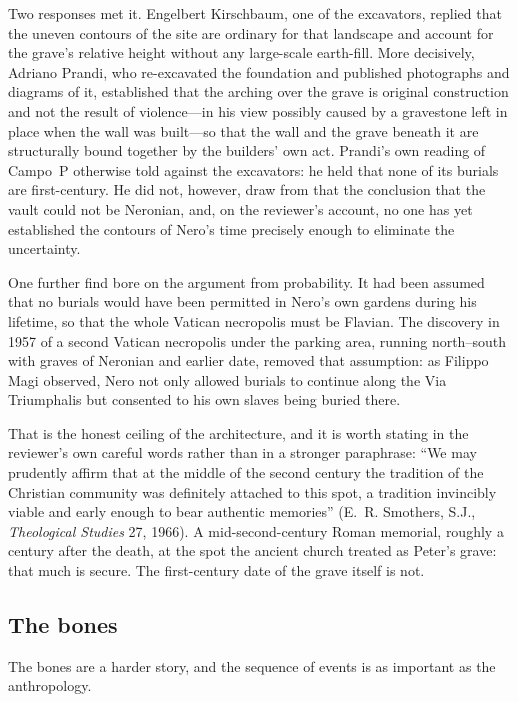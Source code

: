 Two responses met it. Engelbert Kirschbaum, one of the excavators, replied
that the uneven contours of the site are ordinary for that landscape and
account for the grave's relative height without any large-scale earth-fill.
More decisively, Adriano Prandi, who re-excavated the foundation and
published photographs and diagrams of it, established that the arching over
the grave is original construction and not the result of violence---in his
view possibly caused by a gravestone left in place when the wall was
built---so that the wall and the grave beneath it are structurally bound
together by the builders' own act. Prandi's own reading of Campo~P otherwise
told against the excavators: he held that none of its burials are
first-century. He did not, however, draw from that the conclusion that the
vault could not be Neronian, and, on the reviewer's account, no one has yet
established the contours of Nero's time precisely enough to eliminate the
uncertainty.

One further find bore on the argument from probability. It had been assumed
that no burials would have been permitted in Nero's own gardens during his
lifetime, so that the whole Vatican necropolis must be Flavian. The discovery
in 1957 of a second Vatican necropolis under the parking area, running
north--south with graves of Neronian and earlier date, removed that
assumption: as Filippo Magi observed, Nero not only allowed burials to
continue along the Via Triumphalis but consented to his own slaves being
buried there.

That is the honest ceiling of the architecture, and it is worth stating in the
reviewer's own careful words rather than in a stronger paraphrase: ``We may
prudently affirm that at the middle of the second century the tradition of
the Christian community was definitely attached to this spot, a tradition
invincibly viable and early enough to bear authentic memories''
(E.~R. Smothers, S.J., \textit{Theological Studies} 27, 1966). A
mid-second-century Roman memorial, roughly a century after the death, at the
spot the ancient church treated as Peter's grave: that much is secure. The
first-century date of the grave itself is not.

\subsection{The bones}

The bones are a harder story, and the sequence of events is as important as
the anthropology.

